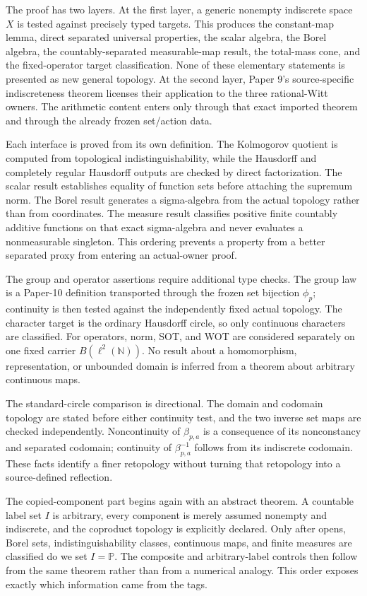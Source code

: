\documentclass[11pt]{article}
\theoremstyle{definition}
\newcommand{\N}{\mathbb N}
\newcommand{\Pp}{\mathbb P}
\begin{document}
The proof has two layers.  At the first layer, a generic nonempty indiscrete space $X$ is tested against precisely typed targets.  This produces the constant-map lemma, direct separated universal properties, the scalar algebra, the Borel algebra, the countably-separated measurable-map result, the total-mass cone, and the fixed-operator target classification.  None of these elementary statements is presented as new general topology.  At the second layer, Paper 9's source-specific indiscreteness theorem licenses their application to the three rational-Witt owners.  The arithmetic content enters only through that exact imported theorem and through the already frozen set/action data.

Each interface is proved from its own definition.  The Kolmogorov quotient is computed from topological indistinguishability, while the Hausdorff and completely regular Hausdorff outputs are checked by direct factorization.  The scalar result establishes equality of function sets before attaching the supremum norm.  The Borel result generates a sigma-algebra from the actual topology rather than from coordinates.  The measure result classifies positive finite countably additive functions on that exact sigma-algebra and never evaluates a nonmeasurable singleton.  This ordering prevents a property from a better separated proxy from entering an actual-owner proof.

The group and operator assertions require additional type checks.  The group law is a Paper-10 definition transported through the frozen set bijection $\phi_p$; continuity is then tested against the independently fixed actual topology.  The character target is the ordinary Hausdorff circle, so only continuous characters are classified.  For operators, norm, SOT, and WOT are considered separately on one fixed carrier $B(\ell^2(\N))$.  No result about a homomorphism, representation, or unbounded domain is inferred from a theorem about arbitrary continuous maps.

The standard-circle comparison is directional.  The domain and codomain topology are stated before either continuity test, and the two inverse set maps are checked independently.  Noncontinuity of $\beta_{p,a}$ is a consequence of its nonconstancy and separated codomain; continuity of $\beta_{p,a}^{-1}$ follows from its indiscrete codomain.  These facts identify a finer retopology without turning that retopology into a source-defined reflection.

The copied-component part begins again with an abstract theorem.  A countable label set $I$ is arbitrary, every component is merely assumed nonempty and indiscrete, and the coproduct topology is explicitly declared.  Only after opens, Borel sets, indistinguishability classes, continuous maps, and finite measures are classified do we set $I=\Pp$.  The composite and arbitrary-label controls then follow from the same theorem rather than from a numerical analogy.  This order exposes exactly which information came from the tags.
\end{document}
